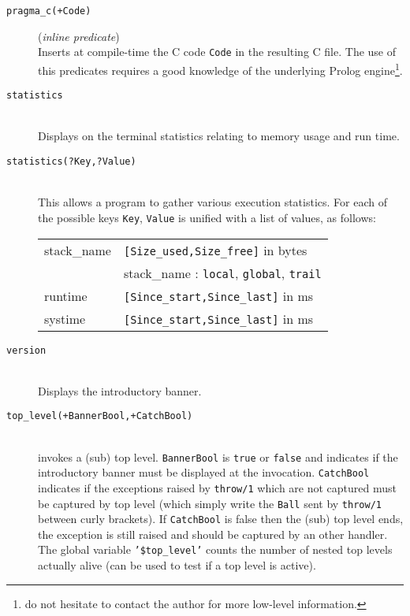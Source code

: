 \begin{description}

\item [{\tt pragma\_c(+Code)}] ({\em inline predicate})~\\
	Inserts at compile-time the C code {\tt Code} in the resulting
	C file. The use of this predicates requires a good knowledge
	of the underlying Prolog engine\footnote{do not hesitate to
	contact the author for more low-level information.}.

\item [{\tt statistics}]~\\
	Displays on the terminal statistics relating to memory usage
	and run time.

\item [{\tt statistics(?Key,?Value)}]~\\
	This allows a program to gather various execution statistics.
	For each of the possible keys {\tt Key}, {\tt Value} is
	unified with a list of values, as follows:\\

	\begin{center}
	\begin{tabular}{|l|l|}
	\hline
	stack\_name & {\tt [Size\_used,Size\_free]} in bytes \\
		    & stack\_name : {\tt local}, {\tt global}, {\tt trail} \\
	\hline
	runtime     & {\tt [Since\_start,Since\_last]} in ms \\
	systime     & {\tt [Since\_start,Since\_last]} in ms \\
	\hline
	\end{tabular}
	\end{center}


\item [{\tt version}]~\\
	Displays the introductory banner.

\item [{\tt top\_level(+BannerBool,+CatchBool)}]~\\
	invokes a (sub) top level. {\tt BannerBool} is {\tt true} or
	{\tt false} and indicates if the introductory banner must be
	displayed at the invocation. {\tt CatchBool} indicates if the
	exceptions raised by {\tt throw/1} which are not captured must be
	captured by top level (which simply write the {\tt Ball} sent
	by {\tt throw/1} between curly brackets). 
	If {\tt CatchBool} is false then the (sub) top level ends, the
	exception is still raised and should be captured by an other
	handler.
	The global variable {\tt '\$top\_level'} counts the number of
	nested top levels actually alive (can be used to test if a top
	level is active).


\end{description}
